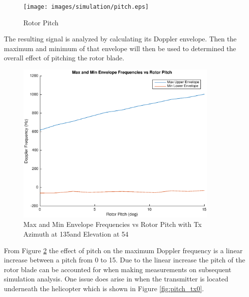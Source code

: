 \begin{figure}
	\begin{center}
		\texttt{[image: images/simulation/pitch.eps]}
		\caption{Rotor Pitch}
		\label{fig:blade_pitch}
	\end{center}
\end{figure}

The resulting signal is analyzed by calculating its Doppler envelope. Then the maximum and minimum of that envelope will then be used to determined the overall effect of pitching the rotor blade. 

\begin{figure}
	\begin{center}
		\includegraphics[width=10cm]{images/simulation/pitch_max_doppler.eps}
		\caption{Max and Min Envelope Frequencies vs Rotor Pitch with Tx Azimuth at 135\textdegree \space and Elevation at 54\textdegree}
		\label{fig:pitch_15_135deg}
	\end{center}
\end{figure}

From Figure \ref{fig:pitch_15_135deg} the effect of pitch on the maximum Doppler frequency is a linear increase between a pitch from 0 \textdegree \space to 15\textdegree. Due to the linear increase the pitch of the rotor blade can be accounted for when making measurements on subsequent simulation analysis. One issue does arise in when the transmitter is located underneath the helicopter which is shown in Figure \ref{fig:pitch_tx0}.

